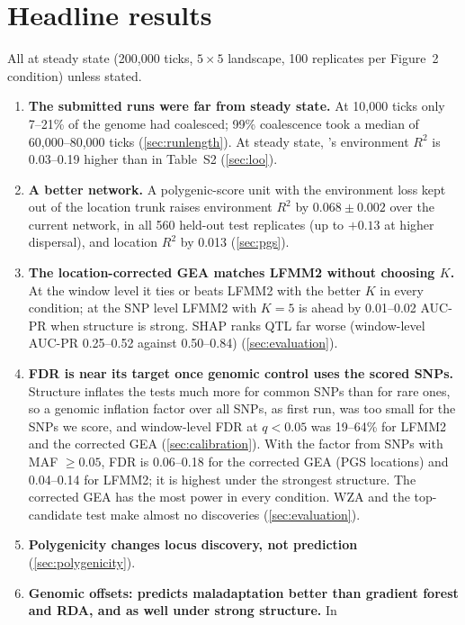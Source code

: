 \section{Headline results}
\label{sec:headlines}

All at steady state (200,000 ticks, $5\times5$ landscape, 100 replicates per
Figure~2 condition) unless stated.
\begin{enumerate}
\item \textbf{The submitted runs were far from steady state.} At 10,000
  ticks only 7--21\% of the genome had coalesced; 99\% coalescence took a
  median of 60,000--80,000 ticks (\cref{sec:runlength}). At steady state,
  \ecolocator's environment $R^2$ is 0.03--0.19 higher than in Table~S2
  (\cref{sec:loo}).
\item \textbf{A better network.} A polygenic-score unit with the
  environment loss kept out of the location trunk raises environment $R^2$
  by $0.068 \pm 0.002$ over the current network, in all 560 held-out test
  replicates (up to $+0.13$ at higher dispersal), and location $R^2$ by
  0.013 (\cref{sec:pgs}).
\item \textbf{The location-corrected GEA matches LFMM2 without choosing
  $K$.} At the window level it ties or beats LFMM2 with the better $K$ in
  every condition; at the SNP level LFMM2 with $K=5$ is ahead by 0.01--0.02
  AUC-PR when structure is strong. SHAP ranks QTL far worse (window-level
  AUC-PR 0.25--0.52 against 0.50--0.84) (\cref{sec:evaluation}).
\item \textbf{FDR is near its target once genomic control uses the scored
  SNPs.} Structure inflates the tests much more for common SNPs than for
  rare ones, so a genomic inflation factor over all SNPs, as first run,
  was too small for the SNPs we score, and window-level FDR at $q<0.05$
  was 19--64\% for LFMM2 and the corrected GEA (\cref{sec:calibration}). With the factor
  from SNPs with MAF $\geq 0.05$, FDR is 0.06--0.18 for the corrected GEA
  (PGS locations) and 0.04--0.14 for LFMM2; it is highest under the
  strongest structure. The corrected GEA has the most power in every
  condition. WZA and the top-candidate test make almost no discoveries
  (\cref{sec:evaluation}).
\item \textbf{Polygenicity changes locus discovery, not prediction}
  (\cref{sec:polygenicity}).
\item \textbf{Genomic offsets: \ecolocator predicts maladaptation better
  than gradient forest and RDA, and as well under strong structure.} In

\end{enumerate}
